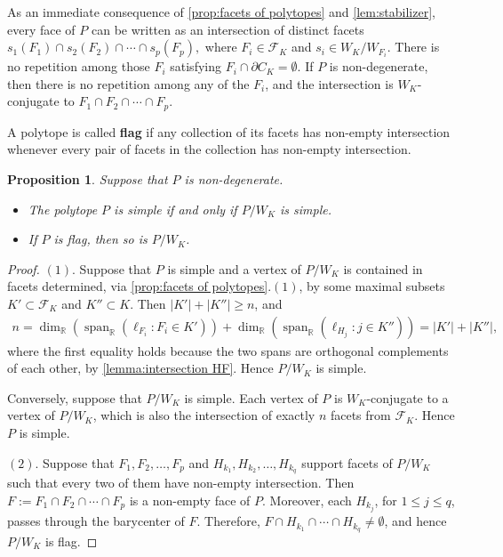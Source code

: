 \documentclass{amsart}
\theoremstyle{plain} \numberwithin{equation}{section}
\newtheorem{proposition}[theorem]{Proposition}
\theoremstyle{definition}
\newcommand{\R}{\mathbb{R}}
\DeclareMathOperator{\spn}{span}
\begin{document}
As an immediate consequence of \cref{prop:facets of polytopes} and \cref{lem:stabilizer}, every face of $P$ can be written as an intersection of distinct facets
$s_1(F_1)\cap s_2(F_2)\cap \cdots\cap s_p(F_p),$
 where $F_i \in \mathcal{F}_K$ and $s_i \in W_K/W_{F_i}$. There is no repetition among those $F_i$ satisfying $F_i \cap \partial C_K = \emptyset$. If $P$ is non-degenerate, then there is no repetition among any of the $F_i$, and the intersection is $W_K$-conjugate to
 $F_1\cap F_2\cap \cdots\cap F_p.$




A polytope is called \textbf{flag} if any collection of its facets has non-empty intersection whenever every pair of facets in the collection has non-empty intersection.

\begin{proposition}\label{lem:simple flag}
  Suppose that $P$ is non-degenerate.
  \begin{itemize}
    \item[$(1)$] The polytope $P$ is simple if and only if $P/W_K$ is simple.
    \item[$(2)$] If $P$ is flag, then so is $P/W_K$.
  \end{itemize}
\end{proposition}
\begin{proof}
  $(1)$. Suppose that $P$ is simple and a vertex of $P/W_K$ is contained in facets determined, via \cref{prop:facets of polytopes}.$(1)$, by some maximal subsets $K'\subset \mathcal{F}_K$ and  $K''\subset K$. Then  $|K'|+|K''|\ge n$, and  
  \begin{align*}
    n=\dim_{\R}\left(\spn_{\R}\left(\ell_{F_{i}}: F_i\in K'\right)\right)+\dim_{\R}\left(\spn_{\R}\left(\ell_{H_{j}}: j\in K''\right)\right)=|K'|+|K''|,
  \end{align*}
  where the first equality holds because the two spans are orthogonal complements of each other, by \cref{lemma:intersection HF}. Hence $P/W_K$ is simple.

  Conversely, suppose that $P/W_K$ is simple. Each vertex of $P$ is $W_K$-conjugate to a vertex of $P/W_K$, which is also the intersection of exactly $n$ facets from $\mathcal{F}_K$.
Hence $P$ is simple.

  $(2)$. Suppose that $F_{1}, F_{2},\ldots, F_{p}$ and $H_{k_1}, H_{k_2},\ldots, H_{k_q}$ support facets of $P/W_K$  such that every two of them have non-empty intersection.
  Then $F:=F_{1}\cap F_{2}\cap\cdots\cap F_{p}$ is a non-empty face of $P$. 
  Moreover, each $H_{k_j}$, for $1\leq j\leq q$, passes through the  barycenter of $F$.
  Therefore, 
  $F\cap H_{k_1}\cap\cdots\cap H_{k_q}\ne \emptyset$, and hence $P/W_K$ is flag.
  \qedhere
\end{proof}
\end{document}
